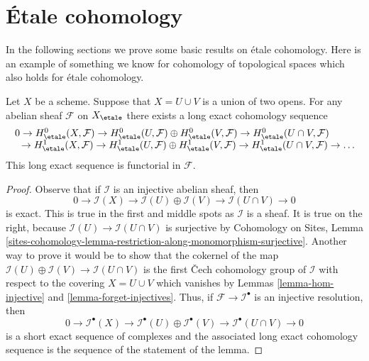 \section{\'Etale cohomology}
\label{section-etale-cohomology}

\noindent
In the following sections we prove some basic results on \'etale cohomology.
Here is an example of something we know for cohomology of topological
spaces which also holds for \'etale cohomology.

\begin{lemma}
\label{lemma-mayer-vietoris}
Let $X$ be a scheme. Suppose that $X = U \cup V$ is a
union of two opens. For any abelian sheaf $\mathcal{F}$ on $X_\etale$
there exists a long exact cohomology sequence
$$
\begin{matrix}
0 \to
H^0_\etale(X, \mathcal{F}) \to
H^0_\etale(U, \mathcal{F}) \oplus H^0_\etale(V, \mathcal{F}) \to
H^0_\etale(U \cap V, \mathcal{F}) \phantom{\to \ldots} \\
\phantom{0} \to H^1_\etale(X, \mathcal{F}) \to
H^1_\etale(U, \mathcal{F}) \oplus H^1_\etale(V, \mathcal{F}) \to
H^1_\etale(U \cap V, \mathcal{F}) \to \ldots
\end{matrix}
$$
This long exact sequence is functorial in $\mathcal{F}$.
\end{lemma}

\begin{proof}
Observe that if $\mathcal{I}$ is an injective abelian sheaf, then
$$
0 \to \mathcal{I}(X) \to \mathcal{I}(U) \oplus \mathcal{I}(V) \to
\mathcal{I}(U \cap V) \to 0
$$
is exact. This is true in the first and middle spots as $\mathcal{I}$
is a sheaf. It is true on the right, because
$\mathcal{I}(U) \to \mathcal{I}(U \cap V)$ is surjective by
Cohomology on Sites, Lemma
\ref{sites-cohomology-lemma-restriction-along-monomorphism-surjective}.
Another way to prove it would be to show that the cokernel
of the map $\mathcal{I}(U) \oplus \mathcal{I}(V) \to
\mathcal{I}(U \cap V)$ is the first {\v C}ech cohomology group
of $\mathcal{I}$ with respect to the covering
$X = U \cup V$ which vanishes by
Lemmas \ref{lemma-hom-injective} and \ref{lemma-forget-injectives}.
Thus, if $\mathcal{F} \to \mathcal{I}^\bullet$ is an injective
resolution, then
$$
0 \to \mathcal{I}^\bullet(X) \to
\mathcal{I}^\bullet(U) \oplus \mathcal{I}^\bullet(V) \to
\mathcal{I}^\bullet(U \cap V) \to 0
$$
is a short exact sequence of complexes and the associated long
exact cohomology sequence is the sequence of the statement of the lemma.
\end{proof}


